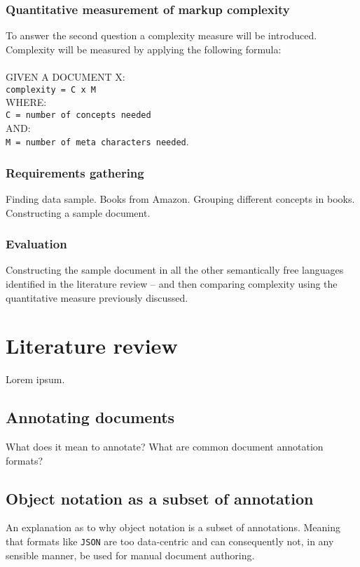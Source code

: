 \documentclass{scrreprt}
\begin{document}
\subsection{Quantitative measurement of markup complexity}
To answer the second question a complexity measure will be introduced. Complexity will be measured by applying the following formula:\\\\
GIVEN A DOCUMENT X:\\
\texttt{complexity = C x M}\\
WHERE:\\
\texttt{C = number of concepts needed}\\
AND:\\
\texttt{M = number of meta characters needed}.



\subsection{Requirements gathering}
Finding data sample. Books from Amazon.
Grouping different concepts in books.
Constructing a sample document.

\subsection{Evaluation}
Constructing the sample document in all the other semantically free languages identified in the literature review -- and then comparing complexity using the quantitative measure previously discussed.






\chapter{Literature review}
Lorem ipsum.

\section{Annotating documents}
What does it mean to annotate? What are common document annotation formats?

\section{Object notation as a subset of annotation}
An explanation as to why object notation is a subset of annotations. Meaning that formats like \texttt{JSON} are too data-centric and can consequently not, in any sensible manner, be used for manual document authoring.
\end{document}
